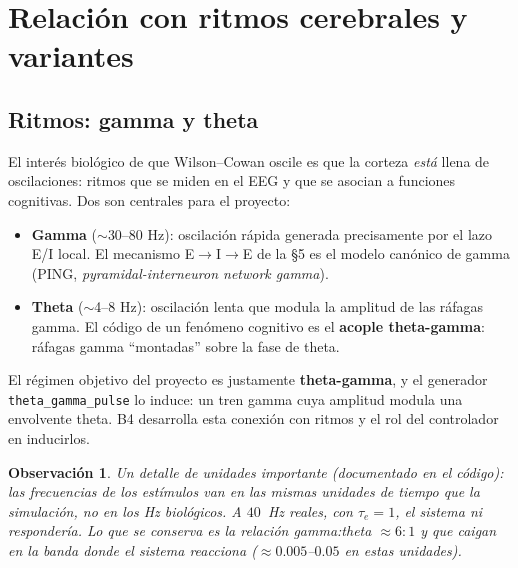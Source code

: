\documentclass[11pt,a4paper]{article}
\newtheorem{remark}{Observación}
\begin{document}
\section{Relación con ritmos cerebrales y variantes}

\subsection{Ritmos: gamma y theta}
El interés biológico de que Wilson--Cowan oscile es que la corteza \emph{está} llena de oscilaciones: ritmos que se miden en el EEG y que se asocian a funciones cognitivas. Dos son centrales para el proyecto:
\begin{itemize}[nosep]
    \item \textbf{Gamma} ($\sim$30--80 Hz): oscilación rápida generada precisamente por el lazo E/I local. El mecanismo E$\to$I$\to$E de la §5 es el modelo canónico de gamma (PING, \emph{pyramidal-interneuron network gamma}).
    \item \textbf{Theta} ($\sim$4--8 Hz): oscilación lenta que modula la amplitud de las ráfagas gamma. El código de un fenómeno cognitivo es el \textbf{acople theta-gamma}: ráfagas gamma ``montadas'' sobre la fase de theta.
\end{itemize}
El régimen objetivo del proyecto es justamente \textbf{theta-gamma}, y el generador \texttt{theta\_gamma\_pulse} lo induce: un tren gamma cuya amplitud modula una envolvente theta. B4 desarrolla esta conexión con ritmos y el rol del controlador en inducirlos.

\begin{remark}
Un detalle de unidades importante (documentado en el código): las frecuencias de los estímulos van en las mismas unidades de tiempo que la simulación, \emph{no} en los Hz biológicos. A $40$~Hz reales, con $\tau_e=1$, el sistema ni respondería. Lo que se conserva es la \emph{relación} gamma:theta $\approx 6{:}1$ y que caigan en la banda donde el sistema reacciona ($\approx 0.005$--$0.05$ en estas unidades).
\end{remark}
\end{document}
